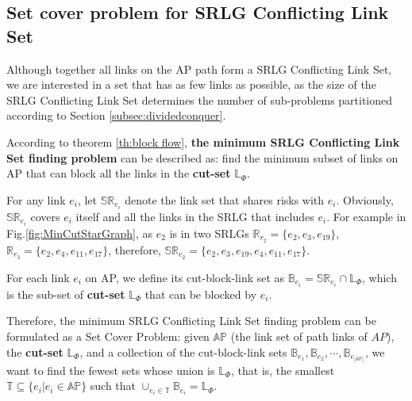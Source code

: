 \subsection{Set cover problem for SRLG Conflicting Link Set}
\label{subsec:Set cover problem for SRLG Conflicting Link Set}
Although together all links on the AP path form a SRLG Conflicting Link Set, we are interested in a set that has as few links as possible, as the size of the SRLG Conflicting Link Set determines the number of sub-problems partitioned according to Section \ref{subsec:dividedconquer}.


According to theorem \ref{th:block flow}, \textbf{the minimum SRLG Conflicting Link Set finding problem} can be described as:  find the minimum subset of links on AP  that can block all the  links in the \textbf{cut-set} $\mathbb{L}_{\Phi}$.

For any link $e_i$, let $\mathbb{SR}_{e_i}$ denote the link set that shares risks with $e_i$. Obviously, $\mathbb{SR}_{e_i}$ covers $e_i$ itself and all the links in the SRLG that includes $e_i$. For example in Fig.\ref{fig:MinCutStarGraph}, as $e_2$ is in two SRLGs $\mathbb{R}_{r_2}=\{e_2,e_3,e_{19}\}$, $\mathbb{R}_{r_3}=\{e_2,e_4,e_{11},e_{17}\}$, therefore, $\mathbb{SR}_{e_2}=\{e_2,e_3,e_{19},e_4,e_{11},e_{17}\}$.

For each link $e_i$ on AP, we define its cut-block-link set as ${\mathbb{B}_{{e_i}}} = \mathbb{SR}_{{e_i}} \cap \mathbb{L}_{\Phi}$, which is the sub-set of \textbf{cut-set} $\mathbb{L}_{\Phi}$ that can be blocked by $e_i$.

Therefore, the minimum SRLG Conflicting Link Set finding problem can be formulated as a Set Cover Problem: given $\mathbb{AP}$ (the link set of path links of $AP$), the \textbf{cut-set} $\mathbb{L}_{\Phi}$,  and a collection of the cut-block-link sets ${\mathbb{B}_{{e_1}}},{\mathbb{B}_{{e_2}}}, \cdots ,{\mathbb{B}_{{e_{|\mathbb{AP}|}}}}$, we want to find the fewest sets whose union is $\mathbb{L}_{\Phi}$, that is, the smallest $\mathbb{T} \subseteq \{e_i| e_i\in \mathbb{AP}\}$ such that ${ \cup_{e_i \in \mathbb{T}}}{\mathbb{B}_{e_i}} = \mathbb{L}_{\Phi}$.

